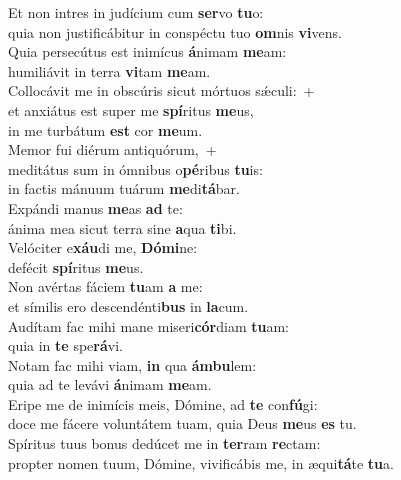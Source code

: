 \evenverse Et non intres in judícium cum \textbf{ser}vo \textbf{tu}o:~\*\\
\evenverse quia non justificábitur in conspéctu tuo \textbf{om}nis \textbf{vi}vens.\\
\oddverse Quia persecútus est inimícus \textbf{á}nimam \textbf{me}am:~\*\\
\oddverse humiliávit in terra \textbf{vi}tam \textbf{me}am.\\
\evenverse Collocávit me in obscúris sicut mórtuos sǽculi:~+\\
\evenverse  et anxiátus est super me \textbf{spí}ritus \textbf{me}us,~\*\\
\evenverse in me turbátum \textbf{est} cor \textbf{me}um.\\
\oddverse Memor fui diérum antiquórum,~+\\
\oddverse  meditátus sum in ómnibus o\textbf{pé}ribus \textbf{tu}is:~\*\\
\oddverse in factis mánuum tuárum \textbf{me}di\textbf{tá}bar.\\
\evenverse Expándi manus \textbf{me}as \textbf{ad} te:~\*\\
\evenverse ánima mea sicut terra sine \textbf{a}qua \textbf{ti}bi.\\
\oddverse Velóciter e\textbf{xáu}di me, \textbf{Dó}\textbf{mi}ne:~\*\\
\oddverse defécit \textbf{spí}ritus \textbf{me}us.\\
\evenverse Non avértas fáciem \textbf{tu}am \textbf{a} me:~\*\\
\evenverse et símilis ero descendénti\textbf{bus} in \textbf{la}cum.\\
\oddverse Audítam fac mihi mane miseri\textbf{cór}diam \textbf{tu}am:~\*\\
\oddverse quia in \textbf{te} spe\textbf{rá}vi.\\
\evenverse Notam fac mihi viam, \textbf{in} qua \textbf{ám}\textbf{bu}lem:~\*\\
\evenverse quia ad te levávi \textbf{á}nimam \textbf{me}am.\\
\oddverse Eripe me de inimícis meis, Dómine, ad \textbf{te} con\textbf{fú}gi:~\*\\
\oddverse doce me fácere voluntátem tuam, quia Deus \textbf{me}us \textbf{es} tu.\\
\evenverse Spíritus tuus bonus dedúcet me in \textbf{ter}ram \textbf{re}ctam:~\*\\
\evenverse propter nomen tuum, Dómine, vivificábis me, in æqui\textbf{tá}te \textbf{tu}a.\\
